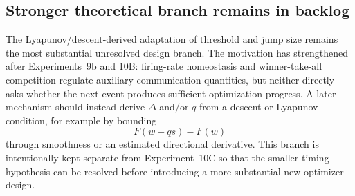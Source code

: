\subsection{Stronger theoretical branch remains in backlog}

The Lyapunov/descent-derived adaptation of threshold and jump size remains the most substantial unresolved design branch. The motivation has strengthened after Experiments~9b and 10B: firing-rate homeostasis and winner-take-all competition regulate auxiliary communication quantities, but neither directly asks whether the next event produces sufficient optimization progress. A later mechanism should instead derive $\Delta$ and/or $q$ from a descent or Lyapunov condition, for example by bounding
\begin{equation}
  F(w+qs)-F(w)
\end{equation}
through smoothness or an estimated directional derivative. This branch is intentionally kept separate from Experiment~10C so that the smaller timing hypothesis can be resolved before introducing a more substantial new optimizer design.
